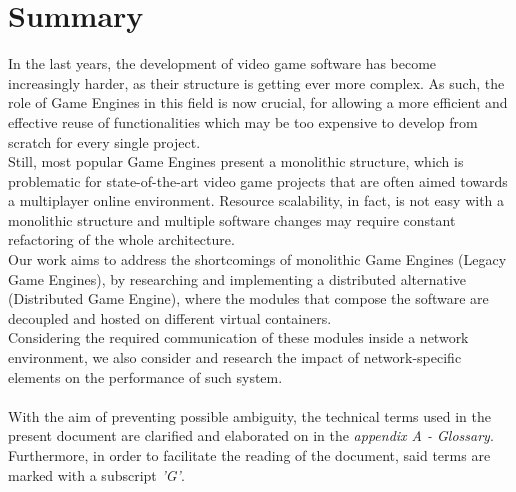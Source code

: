 
\cleardoublepage
{}
{}
\begingroup
\let\clearpage\relax
\let\cleardoublepage\relax
\let\cleardoublepage\relax

\chapter*{Summary}

In the last years, the development of video game software has become increasingly harder, as their structure is getting ever more complex. As such, the role of Game Engines in this field is now crucial, for allowing a more efficient and effective reuse of functionalities which may be too expensive to develop from scratch for every single project. \\
Still, most popular Game Engines present a monolithic structure, which is problematic for state-of-the-art video game projects that are often aimed towards a multiplayer online environment. Resource scalability, in fact,  is not easy with a monolithic structure and multiple software changes may require constant refactoring of the whole architecture. \\
Our work aims to address the shortcomings of monolithic Game Engines (Legacy Game Engines), by researching and implementing a distributed alternative (Distributed Game Engine), where the modules that compose the software are decoupled and hosted on different virtual containers. \\
Considering the required communication of these modules inside a network environment, we also consider and research the impact of network-specific elements on the performance of such system.
\\ \\
With the aim of preventing possible ambiguity, the technical terms used in the present document are clarified and elaborated on in the \textit{appendix A - Glossary}. Furthermore, in order to facilitate the reading of the document, said terms are marked with a subscript \textit{'G'}.
%
%

\endgroup			

\vfill

